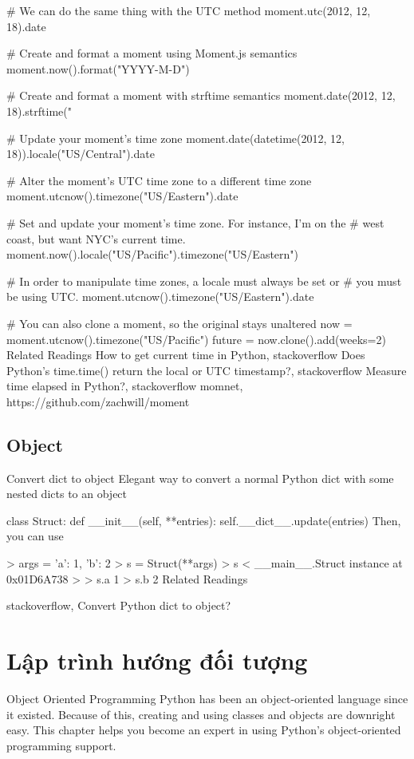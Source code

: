 # We can do the same thing with the UTC method
moment.utc(2012, 12, 18).date

# Create and format a moment using Moment.js semantics
moment.now().format("YYYY-M-D")

# Create and format a moment with strftime semantics
moment.date(2012, 12, 18).strftime("%

# Update your moment's time zone
moment.date(datetime(2012, 12, 18)).locale("US/Central").date

# Alter the moment's UTC time zone to a different time zone
moment.utcnow().timezone("US/Eastern").date

# Set and update your moment's time zone. For instance, I'm on the
# west coast, but want NYC's current time.
moment.now().locale("US/Pacific").timezone("US/Eastern")

# In order to manipulate time zones, a locale must always be set or
# you must be using UTC.
moment.utcnow().timezone("US/Eastern").date

# You can also clone a moment, so the original stays unaltered
now = moment.utcnow().timezone("US/Pacific")
future = now.clone().add(weeks=2)
Related Readings
How to get current time in Python, stackoverflow
Does Python's time.time() return the local or UTC timestamp?, stackoverflow
Measure time elapsed in Python?, stackoverflow
momnet, https://github.com/zachwill/moment

\subsection{Object}

Convert dict to object
Elegant way to convert a normal Python dict with some nested dicts to an object

class Struct:
    def __init__(self, **entries):
        self.__dict__.update(entries)
Then, you can use

> args = {'a': 1, 'b': 2}
> s = Struct(**args)
> s
< __main__.Struct instance at 0x01D6A738 >
> s.a
1
> s.b
2
Related Readings

stackoverflow, Convert Python dict to object?

\section{Lập trình hướng đối tượng}

Object Oriented Programming
Python has been an object-oriented language since it existed. Because of this, creating and using classes and objects are downright easy. This chapter helps you become an expert in using Python's object-oriented programming support.

